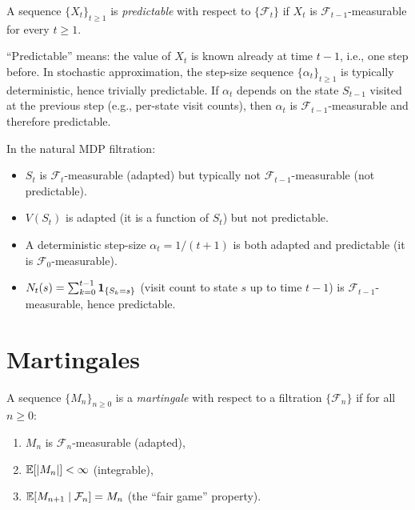 \documentclass[11pt,a4paper]{article}
\begin{document}
\begin{definition}
\label{def:predictable}
A sequence $\{X_t\}_{t \geq 1}$ is \emph{predictable} with
respect to $\{\mathcal{F}_t\}$ if $X_t$ is
$\mathcal{F}_{t-1}$-measurable for every $t \geq 1$.
\end{definition}

\begin{remark}
``Predictable'' means: the value of $X_t$ is known already at
time $t-1$, i.e., one step before.  In stochastic approximation,
the step-size sequence $\{\alpha_t\}_{t \geq 1}$ is typically
deterministic, hence trivially predictable.  If $\alpha_t$
depends on the state $S_{t-1}$ visited at the previous step
(e.g., per-state visit counts), then $\alpha_t$ is
$\mathcal{F}_{t-1}$-measurable and therefore predictable.
\end{remark}

\begin{example}
\label{ex:adapted_vs_pred}
In the natural MDP filtration:
\begin{itemize}[nosep]
  \item $S_t$ is $\mathcal{F}_t$-measurable (adapted) but
    typically not $\mathcal{F}_{t-1}$-measurable
    (not predictable).
  \item $V(S_t)$ is adapted (it is a function of $S_t$) but not
    predictable.
  \item A deterministic step-size $\alpha_t = 1/(t+1)$ is both
    adapted and predictable (it is $\mathcal{F}_0$-measurable).
  \item $N_t(s) = \sum_{k=0}^{t-1} \mathbf{1}_{\{S_k = s\}}$
    (visit count to state $s$ up to time $t-1$) is
    $\mathcal{F}_{t-1}$-measurable, hence predictable.
\end{itemize}
\end{example}


\section{Martingales}
\label{sec:martingales}

\begin{definition}[Martingale]
\label{def:martingale}
A sequence $\{M_n\}_{n \geq 0}$ is a \emph{martingale} with
respect to a filtration $\{\mathcal{F}_n\}$ if for all
$n \geq 0$:
\begin{enumerate}[nosep,label=(\roman*)]
  \item $M_n$ is $\mathcal{F}_n$-measurable (adapted),
  \item $\mathbb{E}[|M_n|] < \infty$ (integrable),
  \item $\mathbb{E}[M_{n+1} \mid \mathcal{F}_n] = M_n$
    (the ``fair game'' property).
  \label{eq:martingale_def}
\end{enumerate}
\end{definition}
\end{document}
